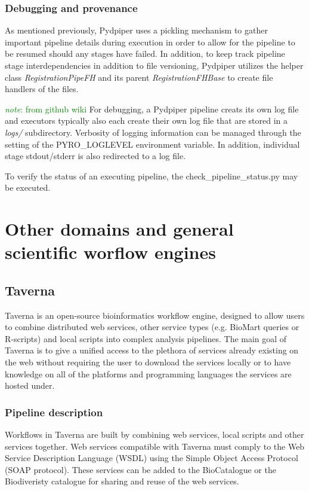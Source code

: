 \documentclass{report}
\newcommand{\note}[1]{\textcolor{green}{\textit{note}: #1}}
\begin{document}
    
        \subsection{Debugging and provenance}

        As mentioned previously, Pydpiper uses a pickling mechanism to gather important pipeline details
        during execution in order to allow for the pipeline to be resumed should any stages have failed.
        In addition, to keep track pipeline stage interdependencies in addition to file versioning, Pydpiper
        utilizes the helper class \textit{RegistrationPipeFH} and its parent \textit{RegistrationFHBase} to create
        file handlers of the files.

        \note{from github wiki}
        For debugging, a Pydpiper pipeline creats its own log file and executors typically also each create 
        their own log file that are stored in a \textit{logs/}
        subdirectory. Verbosity of logging information can be managed through the setting of the PYRO\_LOGLEVEL
        environment variable. In addition, individual stage stdout/stderr is also redirected to a log file.

        To verify the status of an executing pipeline, the check\_pipeline\_status.py may be executed.
 

\chapter{Other domains and general scientific worflow engines}
    \section{Taverna}
    Taverna is an open-source bioinformatics workflow engine, designed to allow users to combine distributed web services, other service
    types (e.g. BioMart queries or R-scripts) and local scripts into complex analysis pipelines. The main goal of
    Taverna is to give a unified access to the plethora of services already existing on the web without requiring
    the user to download the services locally or to have knowledge on all of the platforms and programming languages
    the services are hosted under.

    

        \subsection{Pipeline description}
        Workflows in Taverna are built by combining web services, local scripts and other services together. Web services compatible with
        Taverna must comply to the Web Service Description Language (WSDL) using the Simple Object Access Protocol (SOAP protocol). 
        These services can be added to the BioCatalogue or the Biodiveristy catalogue for sharing and reuse of the web services. 
\end{document}
